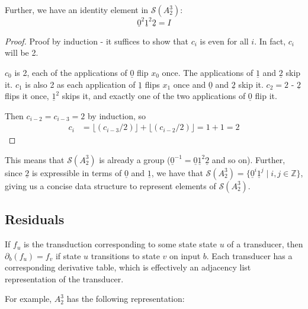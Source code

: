 \documentclass[11pt]{article}
\theoremstyle{pleasant}
\newcommand{\0}{\underline{0}}
\newcommand{\1}{\underline{1}}
\newcommand{\2}{\underline{2}}
\newcommand{\Z}{\mathbb{Z}}
\renewcommand{\S}{\mathcal{S}}
\begin{document}
Further, we have an identity element in $\S(A^3_2)$: $$\0^2\1^2\2 = I$$
\begin{proof}
Proof by induction - it suffices to show that $c_i$ is even for all $i$. In fact, $c_i$ will be 2.

$c_0$ is 2, each of the applications of $\0$ flip $x_0$ once. The applications of $\1$ and $\2$ skip it. $c_1$ is also 2 as each application of $\1$ flips $x_1$ once and $\0$ and $\2$ skip it. $c_2 = 2$ - $\2$ flips it once, $\1^2$ skips it, and exactly one of the two applications of $\0$ flip it.

Then $c_{i-2} = c_{i-3} = 2$ by induction, so
\begin{align*}
c_i &= \lfloor (c_{i-3} / 2) \rfloor + \lfloor (c_{i-2} / 2) \rfloor = 1 + 1 = 2
\end{align*}
\end{proof}
This means that $\S(A^3_2)$ is already a group ($\0^{-1} = \0\1^2\2$ and so on). Further, since $\2$ is expressible in terms of $\0$ and $\1$, we have that $\S(A^3_2) = \{ \0^i \1^j \mid i, j \in \Z \}$, giving us a concise data structure to represent elements of $\S(A^3_2)$.


\subsection*{Residuals}
If $f_u$ is the transduction corresponding to some state state $u$ of a transducer, then $\partial_b(f_u) = f_v$ if state $u$ transitions to state $v$ on input $b$. Each transducer has a corresponding derivative table, which is effectively an adjacency list representation of the transducer.

For example, $A^3_2$ has the following representation:
\end{document}

